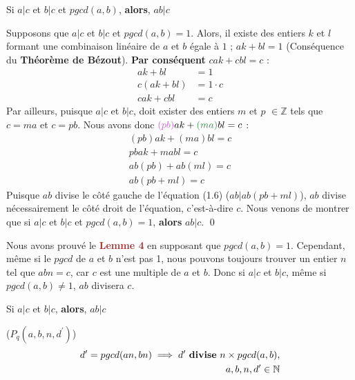 \documentclass[16pt]{report}
\begin{document}
\begin{multicols*}{2}
\begin{Lemme}{}{}
        Si $a|c$ et $b|c$ et $pgcd(a,b)$, \textbf{alors}, $ab|c$    
    \end{Lemme}
    \begin{Preuve*}{}{}
        Supposons que $a|c$ et $b|c$ et $pgcd(a,b) = 1$. Alors, il existe des entiers $k$ et $l$ formant 
        une combinaison linéaire de $a$ et $b$ égale à $1$ ; $ak + bl = 1$ 
        (Conséquence du \textbf{Théorème de Bézout}). \textbf{Par conséquent} $cak + cbl = c$ :
        \begin{align*}
                    ak + bl &=  1 \\ 
                    c(ak + bl) &= 1 \cdot c \\ 
                    cak + cbl &= c 
        \end{align*}
        Par ailleurs, puisque $a|c$ et $b|c$, doit exister des entiers $m$ et $p$ $\in \mathbb{Z}$ 
        tels que \textcolor{myg}{$c = ma$} et \textcolor{myp}{$c = pb$}.  
        Nous avons donc $\textcolor{myp}{(pb)}ak + \textcolor{myg}{(ma)}bl = c$ : 
        \begin{align}
                \nonumber (pb)ak + (ma)bl = c \\  
                \nonumber pbak + mabl = c \\  
                \nonumber ab(pb) + ab(ml) = c \\  
                ab(pb + ml) = c  
        \end{align}
        Puisque $ab$ divise le côté gauche de l'équation (1.6) ($ab|ab(pb +ml)$), $ab$ divise nécessairement 
        le côté droit de l'équation, c'est-à-dire $c$. 
        Nous venons de montrer que si $a|c$ et $b|c$ et $pgcd(a,b) = 1$, \textbf{alors}
        $ab|c$. \qed
    \end{Preuve*}
    Nous avons prouvé le \textcolor{brown}{\textbf{Lemme 4}} en supposant que $pgcd(a,b) = 1$. Cependant, même 
    si le $pgcd$ de $a$ et $b$ n'est pas 1, nous pouvons toujours trouver un entier $n$ tel que 
    $abn = c$, car $c$ est une multiple de $a$ et $b$. Donc si $a|c$ et $b|c$, même si 
    $pgcd(a,b) \neq 1$, $ab$ divisera $c$.  
    \begin{Lemme}{}{}
        Si $a|c$ et $b|c$, \textbf{alors}, $ab|c$    
    \end{Lemme}




    \begin{prop}{($P_q(a,b, n, d^{\prime})$)}{}
    \begin{align*}
             d^{\prime} = pgcd(an, bn) \implies d^{\prime} \text{ \textbf{divise} } n \times pgcd(a,b),
             \\ a, b, n, d^{\prime} \in \mathbb{N} 
    \end{align*}       
    \end{prop}
    

\end{multicols*}
\end{document}
